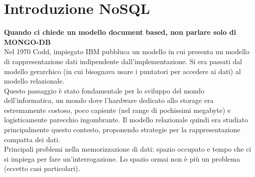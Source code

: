 \section{Introduzione NoSQL}
\textbf{Quando ci chiede un modello document based, non parlare solo di MONGO-DB}\\
Nel 1970 Codd, impiegato IBM pubbluca un modello in cui presenta un modello di rappresentazione dati indipendente dall’implementazione. Si era passati dal modello gerarchico (in cui bisognava usare i puntatori per accedere ai dati) al modello relazionale. \\

Questo passaggio è stato fondamentale per lo sviluppo del mondo dell’informatica, un mondo dove l’hardware dedicato allo storage era estremamente costoso, poco capiente (nel range di pochissimi megabyte) e logisticamente parecchio ingombrante. 
Il modello relazionale quindi era studiato principalmente questo contesto, proponendo strategie per la rappresentazione compatta dei dati.\\
Principali problemi nella memorizzazione di dati: spazio occupato e tempo che ci si impiega per fare un’interrogazione.
Lo spazio ormai non è più un problema (eccetto casi particolari).\\

